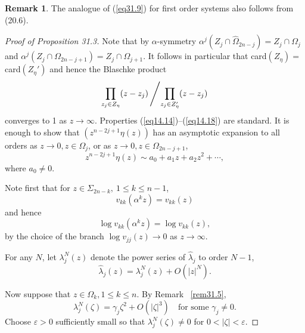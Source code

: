 \documentclass{surv-l}
\theoremstyle{plain}
\theoremstyle{definition}
\newtheorem{remark}[theorem]{Remark}
\numberwithin{equation}{chapter}
\begin{document}
\setcounter{theorem}{11}
\begin{remark}\label{rem31.12}
The analogue of (\ref{eq31.9}) for first order systems also follows from (20.6).
\end{remark}
\begin{proof}[Proof of Proposition 31.3]
Note that by $\alpha$-symmetry $\alpha^{j}(Z_{j}\cap\hat{\Omega}_{2n-j})= Z_{j}\cap\Omega_{j}$ and $\alpha^{j}(Z_{j}\cap\Omega_{2n-j+1})=Z_{j}\cap\Omega_{j+1}$. It follows in particular that card$(Z_{\eta})=$ card$(Z_{\eta}')$ and hence the Blaschke product
\begin{equation*}
\prod_{z_{j}\in Z_{\eta}}(z-z_{j})\left/\prod_{z_{j}\in Z_{\eta}'}(z-z_{j})\right.
\end{equation*}
converges to 1 as $z \rightarrow\infty$. Properties (\ref{eq14.14})--(\ref{eq14.18}) are standard. It is enough to show that $(z^{n-2j+1}\eta(z))$ has an asymptotic expansion to all orders as $z\rightarrow 0, z\in\Omega_{j}$, or as $z\rightarrow 0, z\in\Omega_{2n-j+1}$,
\setcounter{equation}{12}
\begin{equation}\label{eq31.13}
z^{n-2j+1}\eta(z)\sim a_{0}+a_{1}z+a_{2}z^{2}+\cdots,
\end{equation}
where $a_{0}\neq 0$.

Note first that for $z\in{\Sigma}_{2n-k}, \ 1\leq k\leq n-1$,
\begin{equation}\label{eq31.14}
v_{kk}(\alpha^{k}z)=v_{kk}(z)
\end{equation}
and hence
\begin{equation}\label{eq31.15}
\log v_{kk}(\alpha^{k}z)=\log v_{kk}(z),
\end{equation}
by the choice of the branch $\log v_{jj}(z)\rightarrow 0$ as $ z\rightarrow\infty$.

For any $N$, let $\lambda_{j}^{N}(z)$ denote the power series of $\hat{\lambda}_{j}$ to order $N-1$,
\begin{equation}\label{eq31.16}
\hat{\lambda}_{j}(z)=\lambda_{j}^{N}(z)+O(|z|^{N}).
\end{equation}

Now suppose that $z\in\Omega_{k}, 1\leq k\leq n$. By Remark ~\ref{rem31.5},
\begin{equation}\label{eq31.17}
\lambda_{j}^{N}(\zeta)=\gamma_{j}\zeta^{2}+O(|\zeta|^{3})\quad \text{for some } \gamma_{j}\neq 0.
\end{equation}
Choose $\varepsilon >0$ sufficiently small so that $\lambda_{j}^{N}(\zeta)\neq 0$ for $ 0<|\zeta|<\varepsilon$.


\end{proof}
\end{document}
